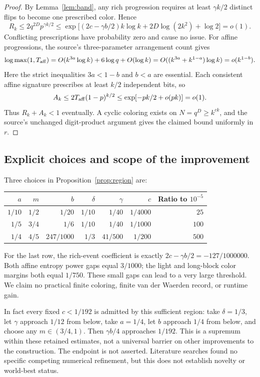 \documentclass[11pt]{article}
\begin{document}
\begin{proof}
By Lemma~\ref{lem:band}, any rich progression requires at least
$\gamma k/2$ distinct flips to become one prescribed color. Hence
\[
 R_k\le2q^{2D}p^{\gamma k/2}
 \le\exp\bigl[(2c-\gamma b/2)k\log k
                  +2D\log(2k^2)+\log2\bigr]=o(1).
\]
Conflicting prescriptions have probability zero and cause no issue.
For affine progressions, the source's three-parameter arrangement count
gives
\[
 \log\max(1,T_{\rm aff})
 =O(k^{3a}\log k)+6\log q+O(\log k)
 =O((k^{3a}+k^{1-a})\log k)=o(k^{1-b}).
\]
Here the strict inequalities $3a<1-b$ and $b<a$ are essential.
Each consistent affine signature prescribes at least $k/2$ independent
bits, so
\[
 A_k\le2T_{\rm aff}(1-p)^{k/2}
 \le\exp[-pk/2+o(pk)]=o(1).
\]
Thus $R_k+A_k<1$ eventually. A cyclic coloring exists on
$N=q^D\ge k^{ck}$, and the source's unchanged digit-product argument
gives the claimed bound uniformly in $r$.
\end{proof}

\subsection{Explicit choices and scope of the improvement}
Three choices in Proposition~\ref{prop:region} are:
\begin{center}\small
\begin{tabular}{@{}rrrrrrr@{}}
\toprule
$a$&$m$&$b$&$\delta$&$\gamma$&$c$&Ratio to $10^{-5}$\\
\midrule
$1/10$&$1/2$&$1/20$&$1/10$&$1/40$&$1/4000$&$25$\\
$1/5$&$3/4$&$1/6$&$1/10$&$1/40$&$1/1000$&$100$\\
$1/4$&$4/5$&$247/1000$&$1/3$&$41/500$&$1/200$&$500$\\
\bottomrule
\end{tabular}
\end{center}
For the last row, the rich-event coefficient is exactly
$2c-\gamma b/2=-127/1000000$.
Both affine entropy power gaps equal $3/1000$; the light and long-block
color margins both equal $1/750$.
These small gaps can lead to a very large threshold. We claim no
practical finite coloring, finite van der Waerden record, or runtime gain.

In fact every fixed $c<1/192$ is admitted by this sufficient region:
take $\delta=1/3$, let $\gamma$ approach $1/12$ from below,
take $a=1/4$, let $b$ approach $1/4$ from below, and choose any
$m\in(3/4,1)$. Then $\gamma b/4$ approaches $1/192$.
This is a supremum within these retained estimates, not a universal
barrier on other improvements to the construction. The endpoint is not
asserted. Literature searches found no specific competing numerical
refinement, but this does not establish novelty or world-best status.
\end{document}
